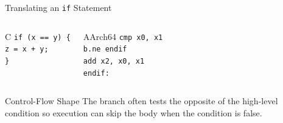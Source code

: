 \documentclass[aspectratio=169,11pt,t]{beamer}
\newcommand{\code}[1]{\texttt{#1}}
\begin{document}
\begin{frame}{Translating an \code{if} Statement}
\begin{columns}[T,onlytextwidth]
\begin{block}{C}
\large
\hspace{0.6cm}\code{if (x == y) \{}\\[0.10cm]
\hspace{1.1cm}\code{z = x + y;}\\[0.10cm]
\hspace{0.6cm}\code{\}}
\normalsize
\end{block}
\begin{block}{AArch64}
\large
\hspace{1.2cm}\code{cmp x0, x1}\\[0.10cm]
\hspace{1.2cm}\code{b.ne endif}\\[0.10cm]
\hspace{1.2cm}\code{add x2, x0, x1}\\[0.10cm]
\hspace{0.7cm}\code{endif:}
\normalsize
\end{block}
\end{columns}
\vspace{0.2cm}
\begin{block}{Control-Flow Shape}
The branch often tests the opposite of the high-level condition so execution can skip the body when the condition is false.
\end{block}
\end{frame}



\end{document}
